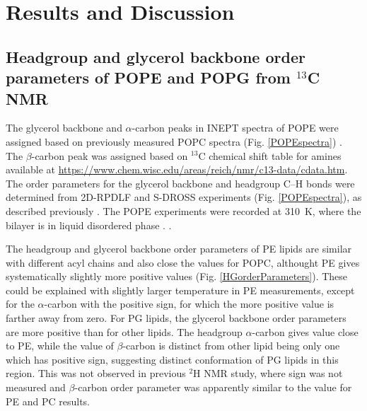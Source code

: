 \documentclass[aps,prl,superscriptaddress,twocolumn]{revtex4}
\begin{document}
\clearpage
\section{Results and Discussion}

\subsection{Headgroup and glycerol backbone order parameters of POPE and POPG from $^{13}$C NMR}

The glycerol backbone and $\alpha$-carbon peaks in INEPT spectra of POPE were assigned based on
previously measured POPC spectra (Fig. \ref{POPEspectra}) \cite{ferreira13}. The $\beta$-carbon peak was assigned based
on $^{13}$C chemical shift table for amines available at \url{https://www.chem.wisc.edu/areas/reich/nmr/c13-data/cdata.htm}.
The order parameters for the glycerol backbone and headgroup C--H bonds were determined
from 2D-RPDLF and S-DROSS experiments (Fig. \ref{POPEspectra}), as described previously \cite{NMRlipidsIVps}.
The POPE experiments were recorded at 310~K, where the bilayer is in liquid disordered phase \cite{??}.
.


The headgroup and glycerol backbone order parameters of PE lipids are similar with 
different acyl chains and also close the values for POPC, althought PE gives systematically
slightly more positive values (Fig. \ref{HGorderParameters}). These could be explained with slightly larger temperature
in PE measurements, except for the $\alpha$-carbon with the positive sign, for which the
more positive value is farther away from zero. For PG lipids, the glycerol backbone order
parameters are more positive than for other lipids. The headgroup $\alpha$-carbon gives
value close to PE, while the value of $\beta$-carbon is distinct from other lipid being
only one which has positive sign, suggesting distinct conformation of PG lipids in this region.
This was not observed in previous $^2$H NMR study, where sign was not measured and $\beta$-carbon
order parameter was apparently similar to the value for PE and PC results.
\end{document}
